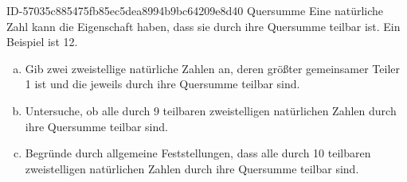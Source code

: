 \begin{exercise}
      {ID-57035c885475fb85ec5dea8994b9bc64209e8d40}
      {Quersumme}
  \ifproblem\problem
    Eine natürliche Zahl kann die Eigenschaft haben, dass sie durch ihre Quersumme
    teilbar ist. Ein Beispiel ist 12.
    \begin{enumerate}[a)]
      \item Gib zwei zweistellige natürliche Zahlen an, deren größter gemeinsamer
            Teiler 1 ist und die jeweils durch ihre Quersumme teilbar sind.
      \item Untersuche, ob alle durch 9 teilbaren zweistelligen natürlichen Zahlen
            durch ihre Quersumme teilbar sind.
      \item Begründe durch allgemeine Feststellungen, dass alle durch 10 teilbaren
            zweistelligen natürlichen Zahlen durch ihre Quersumme teilbar sind.
    \end{enumerate}
  \fi
\end{exercise}
